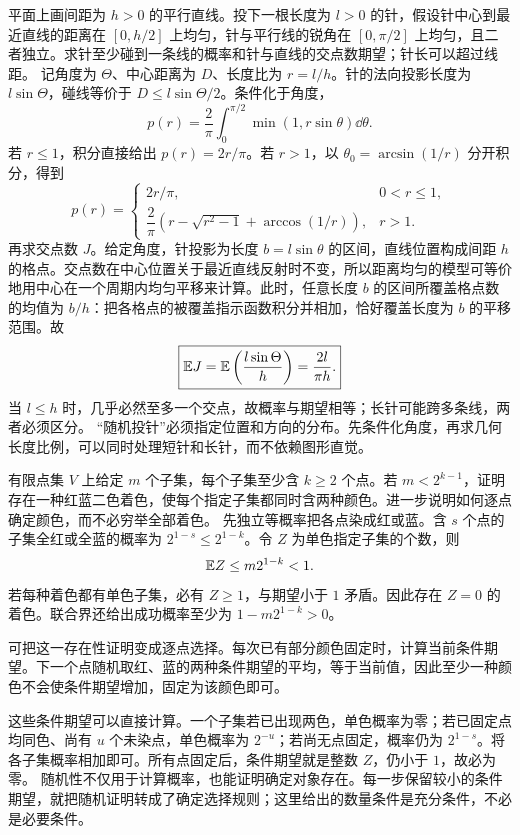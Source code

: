 平面上画间距为 $h>0$ 的平行直线。投下一根长度为 $l>0$ 的针，假设针中心到最近直线的距离在 $[0,h/2]$ 上均匀，针与平行线的锐角在 $[0,\pi/2]$ 上均匀，且二者独立。求针至少碰到一条线的概率和针与直线的交点数期望；针长可以超过线距。
\solution 记角度为 $\Theta$、中心距离为 $D$、长度比为 $r=l/h$。针的法向投影长度为 $l\sin\Theta$，碰线等价于 $D\le l\sin\Theta/2$。条件化于角度，
\[
p(r)=\frac2\pi\int_0^{\pi/2}\min(1,r\sin\theta)\dd\theta.
\]
若 $r\le1$，积分直接给出 $p(r)=2r/\pi$。若 $r>1$，以 $\theta_0=\arcsin(1/r)$ 分开积分，得到
\[
\boxed{p(r)=\begin{cases}
2r/\pi,&0<r\le1,\\
\dfrac2\pi\left(r-\sqrt{r^2-1}+\arccos(1/r)\right),&r>1.
\end{cases}}
\]
再求交点数 $J$。给定角度，针投影为长度 $b=l\sin\theta$ 的区间，直线位置构成间距 $h$ 的格点。交点数在中心位置关于最近直线反射时不变，所以距离均匀的模型可等价地用中心在一个周期内均匀平移来计算。此时，任意长度 $b$ 的区间所覆盖格点数的均值为 $b/h$：把各格点的被覆盖指示函数积分并相加，恰好覆盖长度为 $b$ 的平移范围。故
\[
\boxed{\mathbb{E} J=\mathbb{E}\left(\frac{l\sin\Theta}{h}\right)=\frac{2l}{\pi h}.}
\]
当 $l\le h$ 时，几乎必然至多一个交点，故概率与期望相等；长针可能跨多条线，两者必须区分。
\insight “随机投针”必须指定位置和方向的分布。先条件化角度，再求几何长度比例，可以同时处理短针和长针，而不依赖图形直觉。

有限点集 $V$ 上给定 $m$ 个子集，每个子集至少含 $k\ge2$ 个点。若 $m<2^{k-1}$，证明存在一种红蓝二色着色，使每个指定子集都同时含两种颜色。进一步说明如何逐点确定颜色，而不必穷举全部着色。
\solution 先独立等概率把各点染成红或蓝。含 $s$ 个点的子集全红或全蓝的概率为 $2^{1-s}\le2^{1-k}$。令 $Z$ 为单色指定子集的个数，则
\[
\mathbb{E} Z\le m2^{1-k}<1.
\]
若每种着色都有单色子集，必有 $Z\ge1$，与期望小于 $1$ 矛盾。因此存在 $Z=0$ 的着色。联合界还给出成功概率至少为 $1-m2^{1-k}>0$。

可把这一存在性证明变成逐点选择。每次已有部分颜色固定时，计算当前条件期望。下一个点随机取红、蓝的两种条件期望的平均，等于当前值，因此至少一种颜色不会使条件期望增加，固定为该颜色即可。

这些条件期望可以直接计算。一个子集若已出现两色，单色概率为零；若已固定点均同色、尚有 $u$ 个未染点，单色概率为 $2^{-u}$；若尚无点固定，概率仍为 $2^{1-s}$。将各子集概率相加即可。所有点固定后，条件期望就是整数 $Z$，仍小于 $1$，故必为零。
\insight 随机性不仅用于计算概率，也能证明确定对象存在。每一步保留较小的条件期望，就把随机证明转成了确定选择规则；这里给出的数量条件是充分条件，不必是必要条件。

